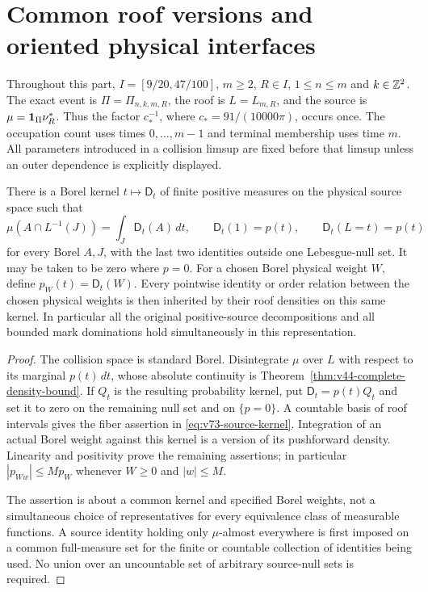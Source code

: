 \section{Common roof versions and oriented physical interfaces}
\label{sec:v73-common-versions}
Throughout this part, $I=[9/20,47/100]$, $m\ge2$, $R\in I$,
$1\le n\le m$ and $k\in\mathbb Z^2$. The exact event is
$\Pi=\Pi_{n,k,m,R}$, the roof is $L=L_{m,R}$, and the source is
$\mu=\mathbf1_\Pi\nu_R^*$. Thus the factor
$c_*^{-1}$, where $c_*=91/(10000\pi)$, occurs once. The occupation
count uses times $0,\ldots,m-1$ and terminal membership uses time $m$.
All parameters introduced in a collision limsup are fixed before that
limsup unless an outer dependence is explicitly displayed.

\begin{lemma}
\label{lem:v73-common-kernel}
There is a Borel kernel $t\mapsto\mathsf D_t$ of finite positive
measures on the physical source space such that
\begin{equation}\label{eq:v73-source-kernel}
 \mu(A\cap L^{-1}(J))=\int_J\mathsf D_t(A)\,dt,
 \qquad \mathsf D_t(1)=p(t),
 \qquad \mathsf D_t(L=t)=p(t)
\end{equation}
for every Borel $A,J$, with the last two identities outside one
Lebesgue-null set. It may be taken to be zero where $p=0$.
For a chosen Borel physical weight $W$, define
$p_W(t)=\mathsf D_t(W)$. Every pointwise identity or order relation
between the chosen physical weights is then inherited by their
roof densities on this same kernel. In particular all the original
positive-source decompositions and all bounded mark dominations
hold simultaneously in this representation.
\end{lemma}
\begin{proof}
The collision space is standard Borel. Disintegrate $\mu$ over $L$
with respect to its marginal $p(t)\,dt$, whose absolute continuity
is Theorem~\ref{thm:v44-complete-density-bound}. If $Q_t$ is the
resulting probability kernel, put $\mathsf D_t=p(t)Q_t$ and set it
to zero on the remaining null set and on $\{p=0\}$. A countable
basis of roof intervals gives the fiber assertion in
\eqref{eq:v73-source-kernel}. Integration of an actual Borel weight
against this kernel is a version of its pushforward density.
Linearity and positivity prove the remaining assertions; in particular
$|p_{Ww}|\le M p_W$ whenever $W\ge0$ and $|w|\le M$.

The assertion is about a common kernel and specified Borel weights,
not a simultaneous choice of representatives for every equivalence
class of measurable functions. A source identity holding only
$\mu$-almost everywhere is first imposed on a common full-measure
set for the finite or countable collection of identities being used.
No union over an uncountable set of arbitrary source-null sets is
required.
\end{proof}

